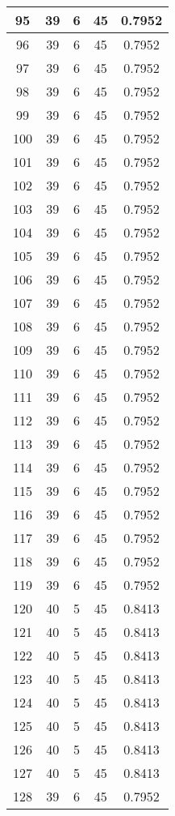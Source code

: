 \documentclass[letterpaper, 12pt]{article}
\begin{document}
\begin{longtable}{|c|c|c|c|c|}
\hline
95 & 39 & 6 & 45 & 0.7952 \\
\hline
96 & 39 & 6 & 45 & 0.7952 \\
\hline
97 & 39 & 6 & 45 & 0.7952 \\
\hline
98 & 39 & 6 & 45 & 0.7952 \\
\hline
99 & 39 & 6 & 45 & 0.7952 \\
\hline
100 & 39 & 6 & 45 & 0.7952 \\
\hline
101 & 39 & 6 & 45 & 0.7952 \\
\hline
102 & 39 & 6 & 45 & 0.7952 \\
\hline
103 & 39 & 6 & 45 & 0.7952 \\
\hline
104 & 39 & 6 & 45 & 0.7952 \\
\hline
105 & 39 & 6 & 45 & 0.7952 \\
\hline
106 & 39 & 6 & 45 & 0.7952 \\
\hline
107 & 39 & 6 & 45 & 0.7952 \\
\hline
108 & 39 & 6 & 45 & 0.7952 \\
\hline
109 & 39 & 6 & 45 & 0.7952 \\
\hline
110 & 39 & 6 & 45 & 0.7952 \\
\hline
111 & 39 & 6 & 45 & 0.7952 \\
\hline
112 & 39 & 6 & 45 & 0.7952 \\
\hline
113 & 39 & 6 & 45 & 0.7952 \\
\hline
114 & 39 & 6 & 45 & 0.7952 \\
\hline
115 & 39 & 6 & 45 & 0.7952 \\
\hline
116 & 39 & 6 & 45 & 0.7952 \\
\hline
117 & 39 & 6 & 45 & 0.7952 \\
\hline
118 & 39 & 6 & 45 & 0.7952 \\
\hline
119 & 39 & 6 & 45 & 0.7952 \\
\hline
120 & 40 & 5 & 45 & 0.8413 \\
\hline
121 & 40 & 5 & 45 & 0.8413 \\
\hline
122 & 40 & 5 & 45 & 0.8413 \\
\hline
123 & 40 & 5 & 45 & 0.8413 \\
\hline
124 & 40 & 5 & 45 & 0.8413 \\
\hline
125 & 40 & 5 & 45 & 0.8413 \\
\hline
126 & 40 & 5 & 45 & 0.8413 \\
\hline
127 & 40 & 5 & 45 & 0.8413 \\
\hline
128 & 39 & 6 & 45 & 0.7952 \\

\end{longtable}
\end{document}
